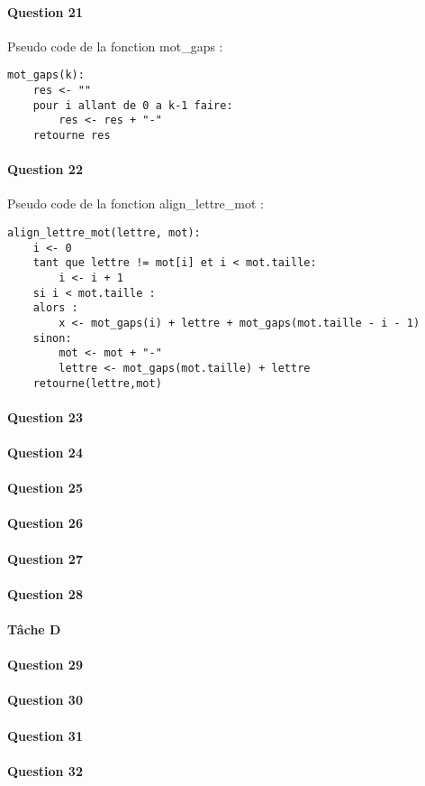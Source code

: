 
\paragraph{Question 21}
Pseudo code de la fonction mot\_gaps :
\begin{lstlisting}
mot_gaps(k):
    res <- ""
    pour i allant de 0 a k-1 faire:
        res <- res + "-"
    retourne res
\end{lstlisting}
\paragraph{Question 22}
Pseudo code de la fonction align\_lettre\_mot :
\begin{lstlisting}
align_lettre_mot(lettre, mot):
    i <- 0
    tant que lettre != mot[i] et i < mot.taille:
        i <- i + 1
    si i < mot.taille :
    alors :
        x <- mot_gaps(i) + lettre + mot_gaps(mot.taille - i - 1)
    sinon:
        mot <- mot + "-"
        lettre <- mot_gaps(mot.taille) + lettre
    retourne(lettre,mot)

\end{lstlisting}

\paragraph{Question 23}
\paragraph{Question 24}
\paragraph{Question 25}
\paragraph{Question 26}
\paragraph{Question 27}
\paragraph{Question 28}
\paragraph{Tâche D}
\paragraph{Question 29}
\paragraph{Question 30}
\paragraph{Question 31}
\paragraph{Question 32}
